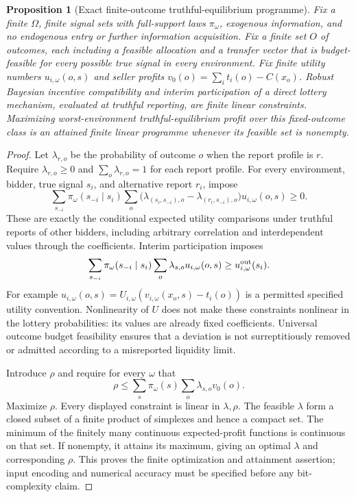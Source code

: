 \documentclass[11pt,a4paper]{article}
\newtheorem{proposition}[theorem]{Proposition}
\theoremstyle{definition}
\begin{document}
\begin{proposition}[Exact finite-outcome truthful-equilibrium programme]
Fix a finite $\Omega$, finite signal sets with full-support laws $\pi_\omega$, exogenous information, and no endogenous entry or further information acquisition. Fix a finite set $O$ of outcomes, each including a feasible allocation and a transfer vector that is budget-feasible for every possible true signal in every environment. Fix finite utility numbers $u_{i,\omega}(o,s)$ and seller profits $v_0(o)=\sum_i t_i(o)-C(x_o)$. Robust Bayesian incentive compatibility and interim participation of a direct lottery mechanism, evaluated at truthful reporting, are finite linear constraints. Maximizing worst-environment truthful-equilibrium profit over this fixed-outcome class is an attained finite linear programme whenever its feasible set is nonempty.
\end{proposition}
\begin{proof}
Let $\lambda_{r,o}$ be the probability of outcome $o$ when the report profile is $r$. Require $\lambda_{r,o}\ge0$ and $\sum_o\lambda_{r,o}=1$ for each report profile. For every environment, bidder, true signal $s_i$, and alternative report $r_i$, impose
\[
 \sum_{s_{-i}}\pi_\omega(s_{-i}\mid s_i)
 \sum_o\bigl(\lambda_{(s_i,s_{-i}),o}-\lambda_{(r_i,s_{-i}),o}\bigr)
                         u_{i,\omega}(o,s)\ge0.
\]
These are exactly the conditional expected utility comparisons under truthful reports of other bidders, including arbitrary correlation and interdependent values through the coefficients. Interim participation imposes
\[
 \sum_{s_{-i}}\pi_\omega(s_{-i}\mid s_i)
       \sum_o\lambda_{s,o}u_{i,\omega}(o,s)\ge u^{\rm out}_{i,\omega}(s_i).
\]
For example $u_{i,\omega}(o,s)=U_{i,\omega}(v_{i,\omega}(x_o,s)-t_i(o))$ is a permitted specified utility convention. Nonlinearity of $U$ does not make these constraints nonlinear in the lottery probabilities: its values are already fixed coefficients. Universal outcome budget feasibility ensures that a deviation is not surreptitiously removed or admitted according to a misreported liquidity limit.

Introduce $\rho$ and require for every $\omega$ that
\[
 \rho\le\sum_s\pi_\omega(s)\sum_o\lambda_{s,o}v_0(o).
\]
Maximize $\rho$. Every displayed constraint is linear in $\lambda,\rho$. The feasible $\lambda$ form a closed subset of a finite product of simplexes and hence a compact set. The minimum of the finitely many continuous expected-profit functions is continuous on that set. If nonempty, it attains its maximum, giving an optimal $\lambda$ and corresponding $\rho$. This proves the finite optimization and attainment assertion; input encoding and numerical accuracy must be specified before any bit-complexity claim.
\end{proof}
\end{document}
